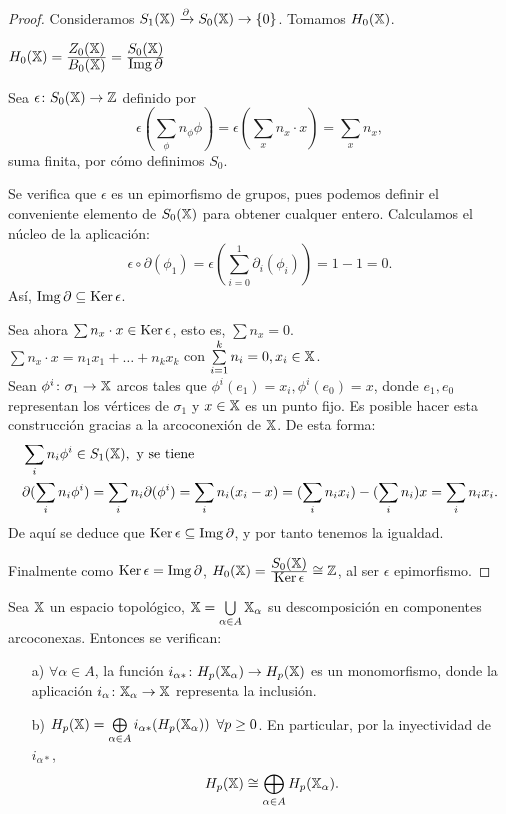 \begin{proof}
  Consideramos $S_{1}({\mathbb X}) \xrightarrow{\partial} S_{0}({\mathbb X}) \to \{0\}$. Tomamos $H_0({\mathbb X})$.

  $H_0({\mathbb X}) = \frac{\displaystyle Z_0({\mathbb X})}{\displaystyle B_0({\mathbb X})} = \frac{\displaystyle S_0({\mathbb X})}{\displaystyle \operatorname{Img} \partial}$

  Sea $\epsilon \colon S_0({\mathbb X}) \to \mathbb{Z}$ definido por \[\epsilon(\sum\limits_{\phi} n_\phi \phi) = \epsilon(\sum\limits_{x} n_x \cdot x) = \sum\limits_{x} n_x, \]
  suma finita, por cómo definimos $S_0$.

  Se verifica que $\epsilon$ es un epimorfismo de grupos, pues podemos definir el conveniente elemento de $S_0({\mathbb X})$ para obtener
  cualquer entero. Calculamos el núcleo de la aplicación:
  \[ \epsilon \circ \partial(\phi_1) = \epsilon(\sum_{i=0}^1 \partial_i(\phi_i)) = 1 - 1 = 0.\]
  Así, $\operatorname{Img} \partial \subseteq \operatorname{Ker} \epsilon$.

  Sea ahora $\sum n_x \cdot x \in \operatorname{Ker} \epsilon$, esto es, $\sum n_x = 0$. \\
  $\sum n_x \cdot x = n_1 x_1 + \dots + n_k x_k$ con $\sum\limits_{i=1}^k n_i = 0, x_i \in {\mathbb X}$. \\
  Sean $\phi^i \colon \sigma_1 \to {\mathbb X}$ arcos tales que $\phi^i(e_1) = x_i, \phi^i(e_0) = x$,
  donde $e_1, e_0$ representan los vértices de $\sigma_1$ y $x \in {\mathbb X}$ es un punto fijo.
  Es posible hacer esta construcción gracias a la arcoconexión de ${\mathbb X}$. De esta forma:
  \begin{align*}
    &\sum_i n_i \phi^i \in S_{1}({\mathbb X}), \text{ y se tiene} \\
    &\partial(\sum_i n_i \phi^i) = \sum_i n_i \partial(\phi^i) = \sum_i n_i(x_i - x) = (\sum_i n_i x_i) - (\sum_i n_i) x = \sum_i n_i x_i.
  \end{align*}
  De aquí se deduce que $\operatorname{Ker} \epsilon \subseteq \operatorname{Img} \partial$, y por tanto tenemos la igualdad.

  Finalmente como $\operatorname{Ker} \epsilon = \operatorname{Img} \partial$, $H_0({\mathbb X}) = \frac{\displaystyle S_0({\mathbb X})}{\displaystyle \operatorname{Ker} \epsilon} \cong \mathbb{Z}$, al ser $\epsilon$ epimorfismo.
\end{proof}

\begin{proposition}
  Sea ${\mathbb X}$ un espacio topológico, ${\mathbb X} = \bigcup\limits_{\alpha \in A} {\mathbb X}_\alpha$ su descomposición en componentes arcoconexas. Entonces se verifican:
  \begin{itemize}
    \item[a)] $\forall \alpha \in A$, la función $i_{\alpha*} \colon H_p({\mathbb X}_\alpha) \to H_p({\mathbb X})$ es un monomorfismo, donde la aplicación
              $i_\alpha \colon {\mathbb X}_\alpha \to {\mathbb X}$ representa la inclusión.
    \item[b)] $H_p({\mathbb X}) = \bigoplus\limits_{\alpha \in A} i_{\alpha*}(H_p({\mathbb X}_\alpha)) \hspace{0.5em} \forall p \geq 0$. En particular, por la inyectividad de $i_{\alpha*}$,
              \[ H_p({\mathbb X}) \cong \bigoplus_{\alpha \in A} H_p({\mathbb X}_\alpha). \]
  \end{itemize}
\end{proposition}

